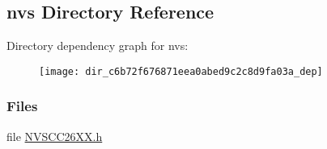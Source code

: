 \subsection{nvs Directory Reference}
\label{dir_c6b72f676871eea0abed9c2c8d9fa03a}
Directory dependency graph for nvs\+:
\nopagebreak
\begin{figure}[H]
\begin{center}
\leavevmode
\texttt{[image: dir\_c6b72f676871eea0abed9c2c8d9fa03a\_dep]}
\end{center}
\end{figure}
\subsubsection*{Files}
\begin{DoxyCompactItemize}
\item 
file \hyperlink{_n_v_s_c_c26_x_x_8h}{N\+V\+S\+C\+C26\+X\+X.\+h}
\end{DoxyCompactItemize}
